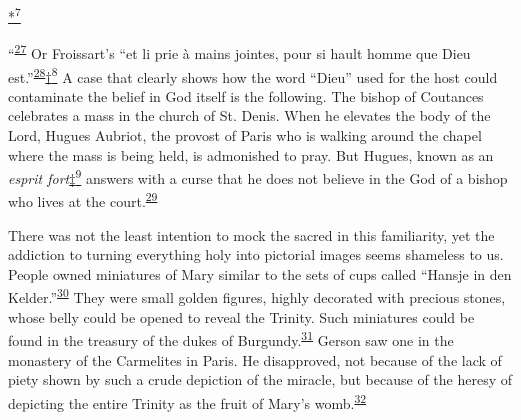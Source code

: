 \protect\hypertarget{13_Chapter_Six__THE_DEPICTION_OF_TH.xhtmlux5cux23id_3001}{\protect\hyperlink{23_NOTES.xhtmlux5cux23id_3002}{*\textsuperscript{7}}}
``\textsuperscript{\protect\hypertarget{13_Chapter_Six__THE_DEPICTION_OF_TH.xhtmlux5cux23id_1217}{\protect\hyperlink{23_NOTES.xhtmlux5cux23id_1218}{27}}}
Or Froissart's ``et li prie à mains jointes, pour si hault homme que
Dieu
est.''\textsuperscript{\protect\hypertarget{13_Chapter_Six__THE_DEPICTION_OF_TH.xhtmlux5cux23id_1215}{\protect\hyperlink{23_NOTES.xhtmlux5cux23id_1216}{28}}}\protect\hypertarget{13_Chapter_Six__THE_DEPICTION_OF_TH.xhtmlux5cux23id_3003}{\protect\hyperlink{23_NOTES.xhtmlux5cux23id_3004}{†\textsuperscript{8}}}
A case that clearly shows how the word ``Dieu'' used for the host could
contaminate the belief in God itself is the following. The bishop of
Coutances celebrates a mass in the church of St. Denis. When he elevates
the body of the Lord, Hugues Aubriot, the provost of Paris who is
walking around the chapel where the mass is being held, is admonished to
pray. But Hugues, known as an \emph{esprit
fort}\protect\hypertarget{13_Chapter_Six__THE_DEPICTION_OF_TH.xhtmlux5cux23id_3005}{\protect\hyperlink{23_NOTES.xhtmlux5cux23id_3006}{‡\textsuperscript{9}}}
answers with a curse that he does not believe in the God of a bishop who
lives at the
court.\textsuperscript{\protect\hypertarget{13_Chapter_Six__THE_DEPICTION_OF_TH.xhtmlux5cux23id_1213}{\protect\hyperlink{23_NOTES.xhtmlux5cux23id_1214}{29}}}

There was not the least intention to mock the sacred in this
familiarity, yet the addiction to turning everything holy into pictorial
images seems shameless to us. People owned miniatures of Mary similar to
the sets of cups called ``Hansje in den
Kelder.''\textsuperscript{\protect\hypertarget{13_Chapter_Six__THE_DEPICTION_OF_TH.xhtmlux5cux23id_1211}{\protect\hyperlink{23_NOTES.xhtmlux5cux23id_1212}{30}}}
They were small golden figures, highly decorated with precious stones,
whose belly could be opened to reveal the Trinity. Such miniatures could
be found in the treasury of the dukes of
Burgundy.\textsuperscript{\protect\hypertarget{13_Chapter_Six__THE_DEPICTION_OF_TH.xhtmlux5cux23id_1209}{\protect\hyperlink{23_NOTES.xhtmlux5cux23id_1210}{31}}}
Gerson saw one in the monastery of the Carmelites in Paris. He
disapproved, not because of the lack of piety shown by such a crude
depiction of the miracle, but because of the heresy of depicting the
entire Trinity as the fruit of Mary's
womb.\textsuperscript{\protect\hypertarget{13_Chapter_Six__THE_DEPICTION_OF_TH.xhtmlux5cux23id_1207}{\protect\hyperlink{23_NOTES.xhtmlux5cux23id_1208}{32}}}

